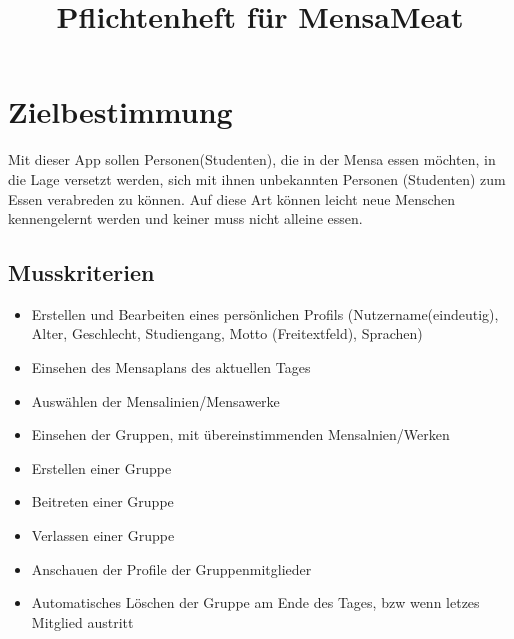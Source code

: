 \documentclass[a4paper]{scrreprt}
\begin{document}
 
\title{Pflichtenheft für MensaMeat}

\maketitle
 
\tableofcontents
 
\chapter{Zielbestimmung}
Mit dieser App sollen Personen(Studenten), die in der Mensa essen möchten, in die Lage versetzt werden, sich mit ihnen unbekannten Personen (Studenten) zum Essen verabreden zu können. Auf diese Art können leicht neue Menschen kennengelernt werden und keiner muss nicht alleine essen.
 
\section{Musskriterien}
\begin{itemize}


\item Erstellen und Bearbeiten eines persönlichen Profils (Nutzername(eindeutig), Alter, Geschlecht, Studiengang, Motto (Freitextfeld), Sprachen)
\item Einsehen des Mensaplans des aktuellen Tages
\item Auswählen der Mensalinien/Mensawerke
\item Einsehen der Gruppen, mit übereinstimmenden Mensalnien/Werken
\item Erstellen einer Gruppe
\item Beitreten einer Gruppe
\item Verlassen einer Gruppe
\item Anschauen der Profile der Gruppenmitglieder
\item Automatisches Löschen der Gruppe am Ende des Tages, bzw wenn letzes Mitglied austritt
\end{itemize}
\end{document}
